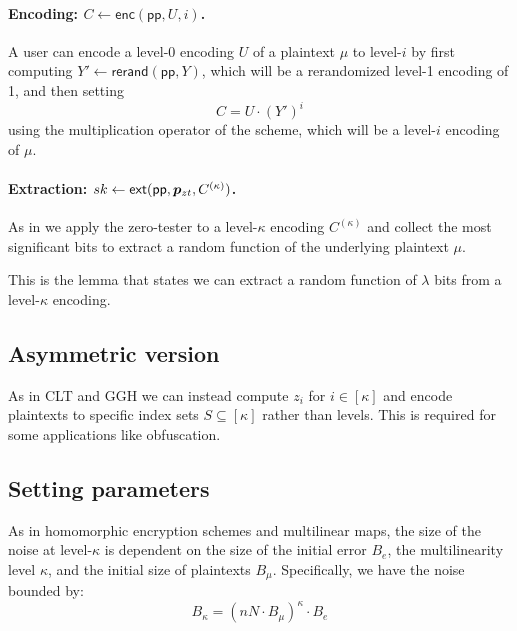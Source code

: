 \paragraph{Encoding:  $C \leftarrow \mathsf{enc}(\mathsf{pp},U,i)$.}  A user can encode a level-0 encoding $U$ of a plaintext $\mu$ to level-$i$ by first computing $Y' \leftarrow \mathsf{rerand}(\mathsf{pp}, Y)$, which will be a rerandomized level-1 encoding of 1, and then setting $$C = U \cdot \left(Y'\right)^i$$ using the multiplication operator of the scheme, which will be a level-$i$ encoding of $\mu$.

\paragraph{Extraction: $sk \leftarrow \mathsf{ext}(\mathsf{pp}, \bm{p}_{zt}, C^{(\kappa)})$.}  As in \cite{ggh13a, clt15} we apply the zero-tester to a level-$\kappa$ encoding $C^{(\kappa)}$ and collect the most significant bits to extract a random function of the underlying plaintext $\mu$.

\begin{lemma}
\label{extraction}
This is the lemma that states we can extract a random function of $\lambda$ bits from a level-$\kappa$ encoding.
\end{lemma}





\subsection{Asymmetric version}

As in CLT and GGH we can instead compute $z_i$ for $i \in [\kappa]$ and encode plaintexts to specific index sets $S \subseteq [\kappa]$ rather than levels.  This is required for some applications like obfuscation.

\subsection{Setting parameters}

As in homomorphic encryption schemes and multilinear maps, the size of the noise at level-$\kappa$ is dependent on the size of the initial error $B_e$, the multilinearity level $\kappa$, and the initial size of plaintexts $B_\mu$.  Specifically, we have the noise bounded by:
\begin{equation}
\label{noise1}
B_\kappa = (nN\cdot B_\mu)^\kappa \cdot B_e
\end{equation}

